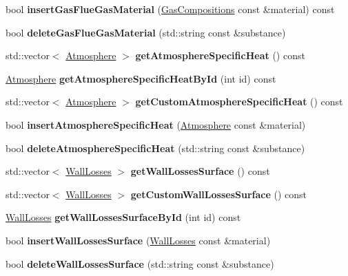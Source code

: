 \begin{DoxyCompactItemize}
bool {\bfseries insert\+Gas\+Flue\+Gas\+Material} (\hyperlink{class_gas_compositions}{Gas\+Compositions} const \&material) const
\item 
\mbox{\label{class_s_q_lite_a474f1d74a2d0b9f38d474398907fea8d}} 
bool {\bfseries delete\+Gas\+Flue\+Gas\+Material} (std\+::string const \&substance)
\item 
\mbox{\label{class_s_q_lite_a04d22b056b51fb07d192833806eabdfc}} 
std\+::vector$<$ \hyperlink{class_atmosphere}{Atmosphere} $>$ {\bfseries get\+Atmosphere\+Specific\+Heat} () const
\item 
\mbox{\label{class_s_q_lite_ae468835cffed182bb9819299463c53b7}} 
\hyperlink{class_atmosphere}{Atmosphere} {\bfseries get\+Atmosphere\+Specific\+Heat\+By\+Id} (int id) const
\item 
\mbox{\label{class_s_q_lite_adecfb81514a3fa09237baa50b2edf5e7}} 
std\+::vector$<$ \hyperlink{class_atmosphere}{Atmosphere} $>$ {\bfseries get\+Custom\+Atmosphere\+Specific\+Heat} () const
\item 
\mbox{\label{class_s_q_lite_a5be90371486d63abd80668c19682051b}} 
bool {\bfseries insert\+Atmosphere\+Specific\+Heat} (\hyperlink{class_atmosphere}{Atmosphere} const \&material)
\item 
\mbox{\label{class_s_q_lite_a5ad78a89bad17d0e23b59a9c018590f9}} 
bool {\bfseries delete\+Atmosphere\+Specific\+Heat} (std\+::string const \&substance)
\item 
\mbox{\label{class_s_q_lite_ac385b0462588b7a18349d1621ceac57c}} 
std\+::vector$<$ \hyperlink{class_wall_losses}{Wall\+Losses} $>$ {\bfseries get\+Wall\+Losses\+Surface} () const
\item 
\mbox{\label{class_s_q_lite_aaf414f89916731a94d8c81a98d36987d}} 
std\+::vector$<$ \hyperlink{class_wall_losses}{Wall\+Losses} $>$ {\bfseries get\+Custom\+Wall\+Losses\+Surface} () const
\item 
\mbox{\label{class_s_q_lite_a3a7f473d8e23630dae65cd3c3dd7fa97}} 
\hyperlink{class_wall_losses}{Wall\+Losses} {\bfseries get\+Wall\+Losses\+Surface\+By\+Id} (int id) const
\item 
\mbox{\label{class_s_q_lite_a97d510f6f16aa70c61a9dc6a629ad786}} 
bool {\bfseries insert\+Wall\+Losses\+Surface} (\hyperlink{class_wall_losses}{Wall\+Losses} const \&material)
\item 
\mbox{\label{class_s_q_lite_aa43f3d56f7caddaef26ad1eccef04118}} 
bool {\bfseries delete\+Wall\+Losses\+Surface} (std\+::string const \&substance)
\end{DoxyCompactItemize}


